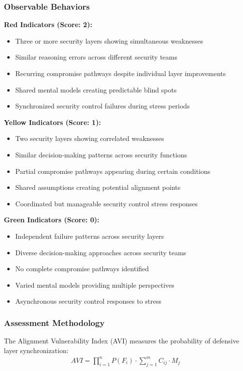 \documentclass[11pt,a4paper]{article}
\begin{document}
\subsubsection{Observable Behaviors}

\textbf{Red Indicators (Score: 2):}
\begin{itemize}
\item Three or more security layers showing simultaneous weaknesses
\item Similar reasoning errors across different security teams
\item Recurring compromise pathways despite individual layer improvements
\item Shared mental models creating predictable blind spots
\item Synchronized security control failures during stress periods
\end{itemize}

\textbf{Yellow Indicators (Score: 1):}
\begin{itemize}
\item Two security layers showing correlated weaknesses
\item Similar decision-making patterns across security functions
\item Partial compromise pathways appearing during certain conditions
\item Shared assumptions creating potential alignment points
\item Coordinated but manageable security control stress responses
\end{itemize}

\textbf{Green Indicators (Score: 0):}
\begin{itemize}
\item Independent failure patterns across security layers
\item Diverse decision-making approaches across security teams
\item No complete compromise pathways identified
\item Varied mental models providing multiple perspectives
\item Asynchronous security control responses to stress
\end{itemize}

\subsubsection{Assessment Methodology}

The Alignment Vulnerability Index (AVI) measures the probability of defensive layer synchronization:
\begin{align}
AVI = \prod_{i=1}^{n} P(F_i) \cdot \sum_{j=1}^{m} C_{ij} \cdot M_{j}
\end{align}
\end{document}
